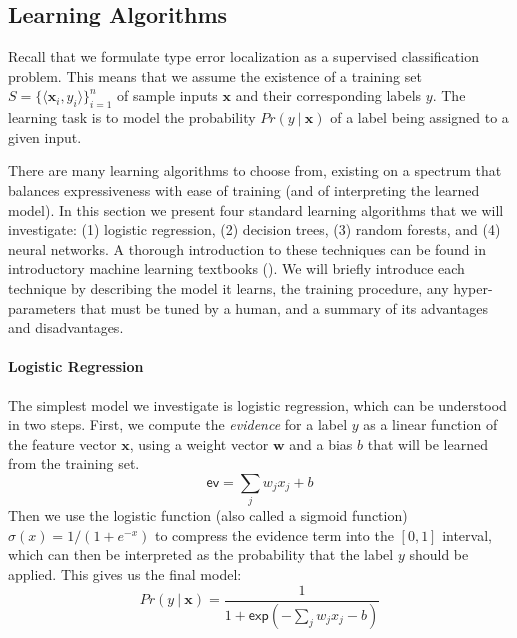 \subsection{Learning Algorithms}
\label{sec:models}
\lstDeleteShortInline{|} %

Recall that we formulate type error localization as a supervised
classification problem.
%
This means that we assume the existence of a training set
$S = \{\langle \mathbf{x}_i, y_i \rangle\}_{i=1}^{n}$
of sample inputs $\mathbf{x}$ and their corresponding labels $y$.
%
The learning task is to model the probability $Pr(y\ |\ \mathbf{x})$
of a label being assigned to a given input.

There are many learning algorithms to choose from, existing
on a spectrum that balances expressiveness with ease of training (and of
interpreting the learned model).
%
In this section we present four standard learning algorithms that we
will investigate:
%
(1) logistic regression,
(2) decision trees,
(3) random forests, and
(4) neural networks.
%
A thorough introduction to these techniques can be found in introductory
machine learning textbooks (\eg {}).
%
We will briefly introduce each technique by describing the model it
learns, the training procedure, any hyper-parameters that must be tuned
by a human, and a summary of its advantages and disadvantages.

\paragraph{Logistic Regression}


The simplest model we investigate is logistic regression, which can be
understood in two steps.
%
First, we compute the \emph{evidence} for a label $y$ as a linear
function of the feature vector $\mathbf{x}$, using a weight vector
$\mathbf{w}$ and a bias $b$ that will be learned from the training set.
$$
\mathsf{ev} = \sum_j w_j x_j + b
$$
Then we use the logistic function (also called a sigmoid function)
$\sigma(x) = 1 / (1 + e^{-x})$ to compress the evidence term into the
$[0,1]$ interval, which can then be interpreted as the probability that
the label $y$ should be applied.
%
This gives us the final model:
$$
Pr(y\ |\ \mathbf{x}) = \frac{1}{1 + \mathsf{exp}(-\sum_j w_j x_j - b)}
$$

